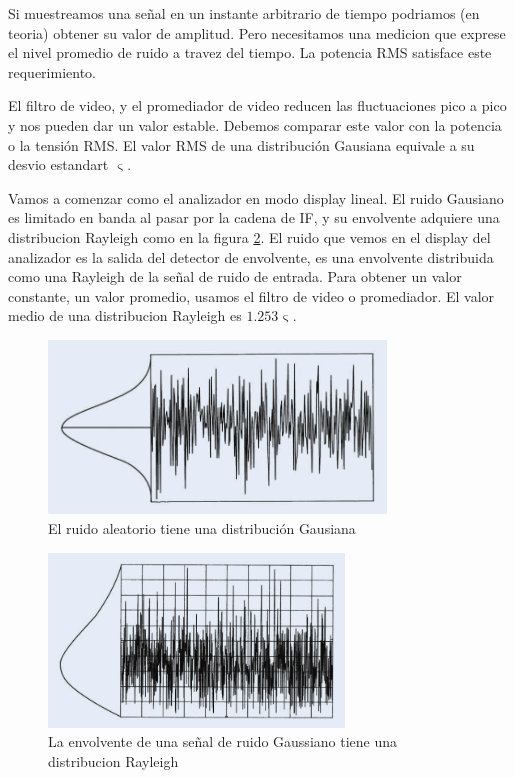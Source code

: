 \documentclass[a4paper,12pt,twoside]{article}
\begin{document}
Si muestreamos una señal en un instante arbitrario de tiempo podriamos (en teoria) obtener su valor de amplitud. Pero necesitamos una medicion que exprese el nivel promedio de ruido a travez del tiempo. La potencia RMS satisface este requerimiento.

El filtro de video, y el promediador de video reducen las fluctuaciones pico a pico y nos pueden dar un valor estable. Debemos comparar este valor con la potencia o la tensión RMS. El valor RMS de una distribución Gausiana equivale a su desvio estandart $\upvarsigma$.

Vamos a comenzar como el analizador en modo display lineal. El ruido Gausiano es limitado en banda al pasar por la cadena de IF, y su envolvente adquiere una distribucion Rayleigh como en la figura \ref{ruido_ray}. El ruido que vemos en el display del analizador es la salida del detector de envolvente, es una envolvente distribuida como una Rayleigh de la señal de ruido de entrada. Para obtener un valor constante, un valor promedio, usamos el filtro de video o promediador. El valor medio de una distribucion Rayleigh es $1.253 \upvarsigma$. 

\begin{figure}[H]
    \includegraphics[width=0.8\textwidth]{../img/ruido_gausiano.png}
        \caption{El ruido aleatorio tiene una distribución Gausiana}
        \label{ruido_gausiano}
\end{figure}

\begin{figure}[H]
    \includegraphics[width=0.7\textwidth]{../img/ruido_ray.png}
        \caption{La envolvente de una señal de ruido Gaussiano tiene una distribucion Rayleigh}
        \label{ruido_ray}
\end{figure}
\end{document}
